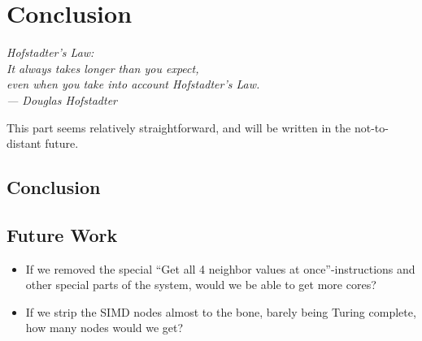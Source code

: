 \chapter{Conclusion}\label{ch:conc}

\begin{flushright}{\slshape
    Hofstadter's Law:\\
    It always takes longer than you expect,\\
    even when you take into account Hofstadter's Law.\\ \medskip
    --- Douglas Hofstadter}
\end{flushright}

This part seems relatively straightforward, and will be written in the
not-to-distant future.

\section{Conclusion}

\section{Future Work}

\begin{itemize}
\item If we removed the special ``Get all 4 neighbor values at
  once''-instructions and other special parts of the system, would we be able to
  get more cores?
\item If we strip the \ac{SIMD} nodes almost to the bone, barely being Turing
  complete, how many nodes would we get?
\end{itemize}
